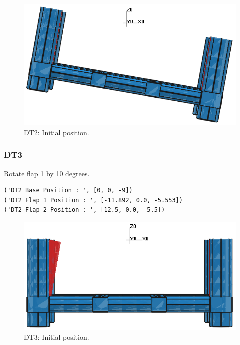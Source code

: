 \documentclass[11pt]{article}
\begin{document}
\begin{figure}[htbp]
\centering
\includegraphics[width=.9\linewidth]{images/system/dt2.png}
\caption{\label{fig:org6aa40c0}
DT2: Initial position.}
\end{figure}


\newpage
\subsubsection{DT3}
\label{sec:org8c1320b}

Rotate flap 1 by 10 degrees.

\begin{verbatim}
('DT2 Base Position : ', [0, 0, -9])
('DT2 Flap 1 Position : ', [-11.892, 0.0, -5.553])
('DT2 Flap 2 Position : ', [12.5, 0.0, -5.5])
\end{verbatim}


\begin{figure}[htbp]
\centering
\includegraphics[width=.9\linewidth]{images/system/dt3.png}
\caption{\label{fig:org54dce10}
DT3: Initial position.}
\end{figure}



\newpage
\end{document}
